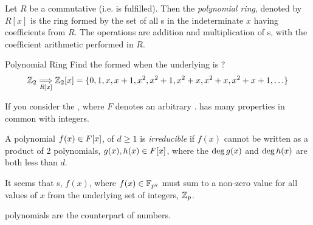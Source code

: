 \begin{definition}\label{def:Polynomial_Ring}
  Let $R$ be a commutative  (i.e.  is fulfilled).
  Then the \emph{polynomial ring}, denoted by $R[x]$ is the ring formed by the set of all s in the indeterminate $x$ having coefficients from $R$.
  The operations are addition and multiplication of s, with the coefficient arithmetic performed in $R$.
\end{definition}

\begin{example}[Lecture 2]{Polynomial Ring}
  Find the  formed when the underlying  is ?
  \tcblower{}
  \begin{equation*}
    \operatorname{\mathbb{Z}}_{2} \underset{R[x]}{\Longrightarrow} \operatorname{\mathbb{Z}}_{2}[x] = \lbrace 0, 1, x, x+1, x^{2}, x^{2}+1, x^{2}+x, x^{2}+x, x^{2}+x+1, \ldots \rbrace
  \end{equation*}
\end{example}

If you consider the , where $F$ denotes an arbitrary .
 has many properties in common with integers.

\begin{definition}[Irreducible]\label{def:Irreducible_Polynomial}
  A polynomial $f(x) \in F[x]$, of  $d \geq 1$ is \emph{irreducible} if $f(x)$ cannot be written as a product of 2 polynomials, $g(x), h(x) \in F[x]$, where the $\operatorname{\operatorname{deg}} g(x)$ and $\operatorname{\operatorname{deg}} h(x)$ are both less than $d$.

  \begin{remark}\label{rmk:Irreducible_Polynomials_Sum_to_Zero}
    It seems that  s, $f(x)$, where $f(x) \in \mathbb{F}_{p^{q}}$ must sum to a non-zero value for all values of $x$ from the underlying set of integers, $\operatorname{\mathbb{Z}}_{p}$.
  \end{remark}

  \begin{remark}\label{rmk:Irreducible_Polynomials_and_Prime_Numbers}
     polynomials are the  counterpart of  numbers.
  \end{remark}
\end{definition}

